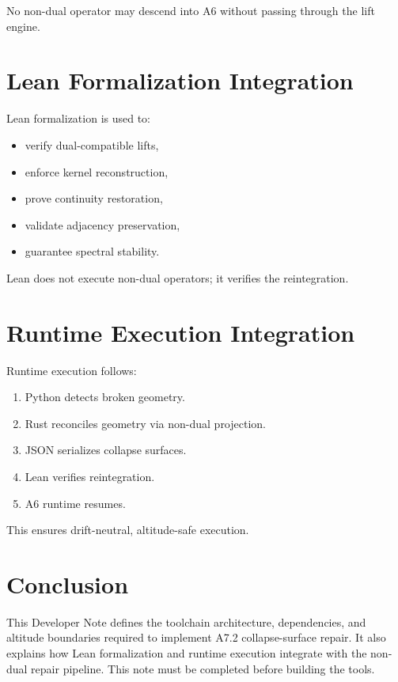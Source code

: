 \documentclass[11pt]{article}
\begin{document}
No non-dual operator may descend into A6 without passing through the lift engine.

\section{Lean Formalization Integration}

Lean formalization is used to:

\begin{itemize}
  \item verify dual-compatible lifts,
  \item enforce kernel reconstruction,
  \item prove continuity restoration,
  \item validate adjacency preservation,
  \item guarantee spectral stability.
\end{itemize}

Lean does not execute non-dual operators; it verifies the reintegration.

\section{Runtime Execution Integration}

Runtime execution follows:

\begin{enumerate}
  \item Python detects broken geometry.
  \item Rust reconciles geometry via non-dual projection.
  \item JSON serializes collapse surfaces.
  \item Lean verifies reintegration.
  \item A6 runtime resumes.
\end{enumerate}

This ensures drift-neutral, altitude-safe execution.

\section{Conclusion}

This Developer Note defines the toolchain architecture, dependencies, and
altitude boundaries required to implement A7.2 collapse-surface repair. It also
explains how Lean formalization and runtime execution integrate with the
non-dual repair pipeline. This note must be completed before building the tools.
\end{document}
